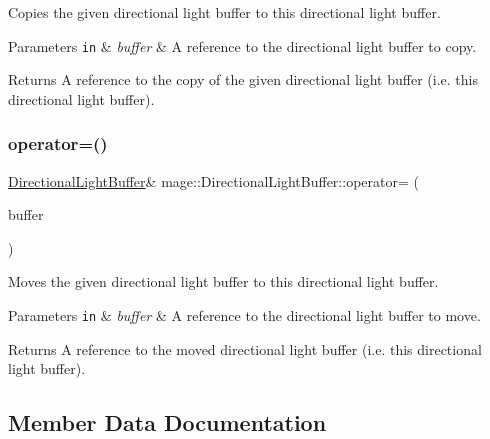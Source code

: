 Copies the given directional light buffer to this directional light buffer.


\begin{DoxyParams}[1]{Parameters}
\mbox{\tt in}  & {\em buffer} & A reference to the directional light buffer to copy. \\
\hline
\end{DoxyParams}
\begin{DoxyReturn}{Returns}
A reference to the copy of the given directional light buffer (i.\+e. this directional light buffer). 
\end{DoxyReturn}
\hypertarget{structmage_1_1_directional_light_buffer_a9af62b47c7ba1b1f6833e8da79b8c054}{}\label{structmage_1_1_directional_light_buffer_a9af62b47c7ba1b1f6833e8da79b8c054} 
\subsubsection{\texorpdfstring{operator=()}{operator=()}\hspace{0.1cm}{\footnotesize\ttfamily [2/2]}}
{\footnotesize\ttfamily \hyperlink{structmage_1_1_directional_light_buffer}{Directional\+Light\+Buffer}\& mage\+::\+Directional\+Light\+Buffer\+::operator= (\begin{DoxyParamCaption}\item[{\hyperlink{structmage_1_1_directional_light_buffer}{Directional\+Light\+Buffer} \&\&}]{buffer }\end{DoxyParamCaption})\hspace{0.3cm}{\ttfamily [default]}}

Moves the given directional light buffer to this directional light buffer.


\begin{DoxyParams}[1]{Parameters}
\mbox{\tt in}  & {\em buffer} & A reference to the directional light buffer to move. \\
\hline
\end{DoxyParams}
\begin{DoxyReturn}{Returns}
A reference to the moved directional light buffer (i.\+e. this directional light buffer). 
\end{DoxyReturn}


\subsection{Member Data Documentation}
\hypertarget{structmage_1_1_directional_light_buffer_a592ac44133a2b851d350a9f9ad2c4788}{}\label{structmage_1_1_directional_light_buffer_a592ac44133a2b851d350a9f9ad2c4788} 
